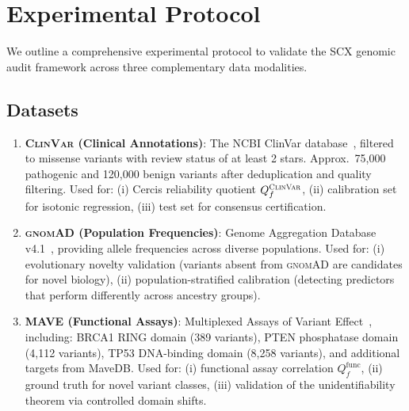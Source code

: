 \documentclass[11pt,a4paper]{article}
\theoremstyle{definition}
\newcommand{\SCX}{\textsc{SCX}}
\newcommand{\ClinVar}{\textsc{ClinVar}}
\newcommand{\gnomAD}{\textsc{gnomAD}}
\newcommand{\MAVE}{\textsc{MAVE}}
\begin{document}
\section{Experimental Protocol}
\label{sec:experimental}
We outline a comprehensive experimental protocol to validate the \SCX{} genomic audit framework across three complementary data modalities.
\subsection{Datasets}
\begin{enumerate}[leftmargin=*,label=\textbf{D\arabic*}]
    \item \textbf{\ClinVar{} (Clinical Annotations)}: The NCBI ClinVar database~\cite{landrum2018clinvar}, filtered to missense variants with review status of at least 2 stars. Approx.\ 75,000 pathogenic and 120,000 benign variants after deduplication and quality filtering. Used for: (i) Cercis reliability quotient $Q_f^{\ClinVar}$, (ii) calibration set for isotonic regression, (iii) test set for consensus certification.
    \item \textbf{\gnomAD{} (Population Frequencies)}: Genome Aggregation Database v4.1~\cite{chen2024genomic}, providing allele frequencies across diverse populations. Used for: (i) evolutionary novelty validation (variants absent from \gnomAD{} are candidates for novel biology), (ii) population-stratified calibration (detecting predictors that perform differently across ancestry groups).
    \item \textbf{\MAVE{} (Functional Assays)}: Multiplexed Assays of Variant Effect~\cite{esposito2019mavedb, weile2017framework}, including: BRCA1 RING domain (389 variants), PTEN phosphatase domain (4,112 variants), TP53 DNA-binding domain (8,258 variants), and additional targets from MaveDB. Used for: (i) functional assay correlation $Q_f^{\text{func}}$, (ii) ground truth for novel variant classes, (iii) validation of the unidentifiability theorem via controlled domain shifts.
\end{enumerate}
\end{document}
